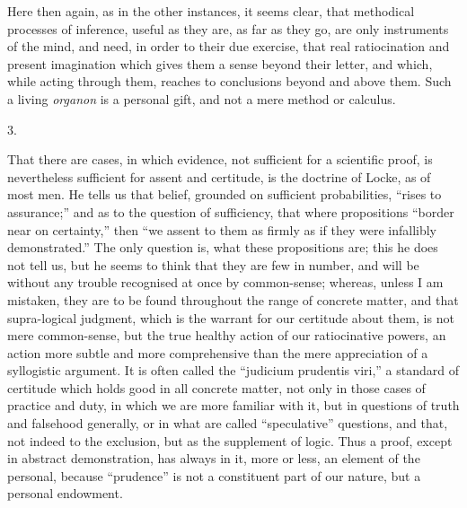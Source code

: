 Here then again, as in the other instances, it seems clear, that
methodical processes of inference, useful as they are, as far as they
go, are only instruments of the mind, and need, in order to their due
exercise, that real ratiocination and present imagination which gives
them a sense beyond their letter, and which, while acting through
them, reaches to conclusions beyond and above them. Such a living \emph{organon}
is a personal gift, and not a mere method or calculus.

3.

That there are cases, in which evidence, not sufficient for a
scientific proof, is nevertheless sufficient for assent and certitude,
is the doctrine of Locke, as of most men. He tells us that belief,
grounded on sufficient probabilities, ``rises to assurance;''
and as to the question of sufficiency, that where propositions
``border near on certainty,'' then ``we assent to them as
firmly as if they were infallibly demonstrated.'' The only
question is, what these propositions are; this he does not tell
us, but he seems to think that they are few in number, and will be
without any trouble recognised at once by common-sense; whereas,
unless I am mistaken, they are to be found throughout the range of
concrete matter, and that supra-logical judgment, which is the warrant
for our certitude about them, is not mere common-sense, but the true
healthy action of our ratiocinative powers, an action more subtle and
more comprehensive than the mere appreciation of a syllogistic
argument. It is often called the ``judicium prudentis viri,''
a standard of certitude which holds good in all concrete matter, not
only in those cases of practice and duty, in which we are more
familiar with it, but in questions of truth and falsehood generally,
or in what are called ``speculative'' questions, and that, not
indeed to the exclusion, but as the supplement of logic. Thus a proof,
except in abstract demonstration, has always in it, more or less, an
element of the personal, because ``prudence'' is not a
constituent part of our nature, but a personal endowment.

